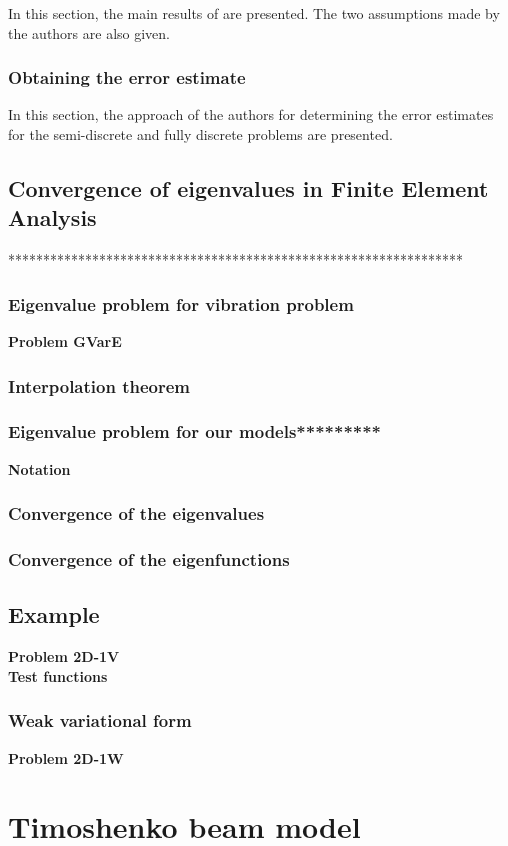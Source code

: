 \documentclass[../main.tex]{subfiles}
\begin{document}
In this section, the main results of \cite{BV13} are presented. The two assumptions made by the authors are also given.

\subsubsection{Obtaining the error estimate}

In this section, the approach of the authors for determining the error estimates for the semi-discrete and fully discrete problems are presented.\\


\subsection{Convergence of eigenvalues in Finite Element Analysis}
*****************************************************************

\subsubsection{Eigenvalue problem for vibration problem}
\textbf{Problem GVarE}
\subsubsection{Interpolation theorem}
\subsubsection{Eigenvalue problem for our models*********}
\textbf{Notation}
\subsubsection{Convergence of the eigenvalues}
\subsubsection{Convergence of the eigenfunctions}
\subsection{Example}
\textbf{Problem 2D-1V}\\
\textbf{Test functions}
\subsubsection{Weak variational form}
\textbf{Problem 2D-1W}
\section{Timoshenko beam model}
\end{document}
